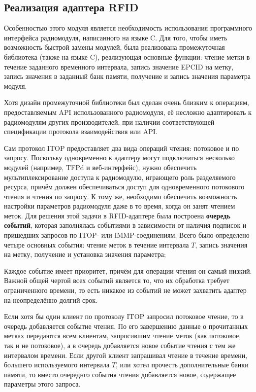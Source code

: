 \subsection{Реализация адаптера RFID}

Особенностью этого модуля является необходимость использования программного интерфейса радиомодуля, написанного на языке C. Для того, чтобы иметь возможность быстрой замены модулей, была реализована промежуточная библиотека (также на языке C), реализующая основные функции: чтение метки в течение заданного временного интервала, запись значение EPCID на метку, запись значения в заданный банк памяти, получение и запись значения параметра модуля.

Хотя дизайн промежуточной библиотеки был сделан очень близким к операциям, предоставляемым API использованного радиомодуля, её несложно адаптировать к радиомодулям других производителей, при наличии соответствующей спецификации протокола взаимодействия или API.

Сам протокол ITOP предоставляет два вида операций чтения: потоковое и по запросу. Поскольку одновременно к адаптеру могут подключаться несколько модулей (например, TFPd и веб-интерфейс), нужно обеспечить мультиплексирование доступа к радиомодулю, играющего роль разделяемого ресурса, причём должен обеспечиваться доступ для одновременного потокового чтения и чтения по запросу. К тому же, необходимо обеспечить возможность настройки параметров радиомодуля даже в то время, когда он занят чтением меток. Для решения этой задачи в RFID-адаптере была построена \textbf{очередь событий}, которая заполнялась событиями в зависимости от наличия подписок и пришедших запросов по ITOP- или IMMP-соединениям. Всего было определено четыре основных события: чтение меток в течение интервала $T$, запись значения на метку, получение и установка значения параметра;

Каждое событие имеет приоритет, причём для операции чтения он самый низкий. Важной общей чертой всех событий является то, что их обработка требует ограниченного времени, то есть никакое из событий не может захватить адаптер на неопределённо долгий срок.

Если хотя бы один клиент по протоколу ITOP запросил потоковое чтение, то в очередь добавляется событие чтения. По его завершению данные о прочитанных метках передаются всем клиентам, запросившим чтение меток (как потоковое, так и не потоковое), а в очередь добавляется новое событие чтения с тем же интервалом времени. Если другой клиент запрашивал чтение в течение времени, большего используемого интервала $T$, или хотел прочесть дополнительные банки памяти, то вместо очереднго события чтения добавляется новое, содержащее параметры этого запроса. 

